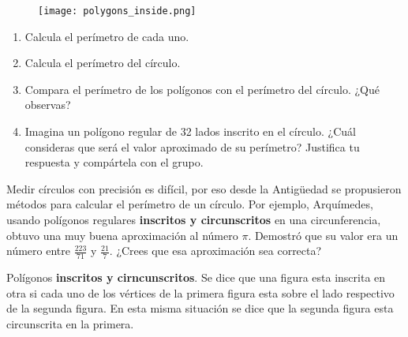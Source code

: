 \documentclass[11pt]{book}
\begin{document}
\begin{enumerate}
        \begin{minipage}{0.3\textwidth}
          \begin{figure}[H]
            \centering
            \texttt{[image: polygons\_inside.png]}
            \label{fig:polygons_inside}
          \end{figure}
        \end{minipage}\hfill
        \begin{minipage}{0.7\textwidth}
          \begin{enumerate}
            \item Calcula el perímetro de cada uno.
            \item Calcula el perímetro del círculo.
            \item Compara el perímetro de los polígonos con el perímetro del círculo. ¿Qué observas?
            \item Imagina un polígono regular de 32 lados inscrito en el círculo. ¿Cuál consideras
                  que será el valor aproximado de su perímetro? Justifica tu respuesta y compártela con el grupo.
          \end{enumerate}
        \end{minipage}

        \begin{boxH}
          Medir círculos con precisión es difícil, por eso desde la Antigüedad se propusieron
          métodos para calcular el perímetro de un círculo. Por ejemplo, Arquímedes, usando
          polígonos regulares \textbf{\color{cyan}inscritos y circunscritos} en una circunferencia, obtuvo una muy
          buena aproximación al número $\pi$. Demostró que su valor era un número entre $\frac{223}{71}$ y $\frac{21}{7}$.
          ¿Crees que esa aproximación sea correcta?
        \end{boxH}

        \begin{boxE}
          Polígonos \textbf{\color{cyan}inscritos y cirncunscritos}. Se dice que una figura esta inscrita en otra si cada
          uno de los vértices de la primera figura esta sobre el lado respectivo de la segunda figura.
          En esta misma situación se dice que la segunda figura esta circunscrita en la primera.
        \end{boxE}


\end{enumerate}
\end{document}
